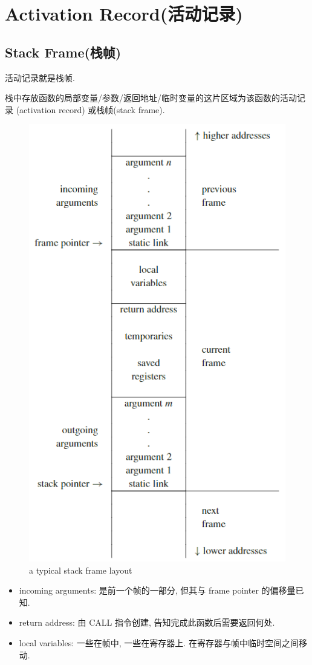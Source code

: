 \section{Activation Record(活动记录)}
\subsection{Stack Frame(栈帧)}
活动记录就是栈帧. 

\begin{definition}
    栈中存放函数的局部变量/参数/返回地址/临时变量的这片区域为该函数的活动记录 (activation record) 或栈帧(stack frame).
\end{definition}
\begin{figure}[H]
    \centering
    \includegraphics[width=0.84\linewidth]{pic/CP678/a typical stack frame layout.png}
    \caption{a typical stack frame layout}
\end{figure}
\begin{itemize}
    \item incoming arguments: 是前一个帧的一部分, 但其与 frame pointer 的偏移量已知.
    \item return address: 由 CALL 指令创建, 告知完成此函数后需要返回何处.
    \item local variables: 一些在帧中, 一些在寄存器上. 在寄存器与帧中临时空间之间移动.
\end{itemize}

